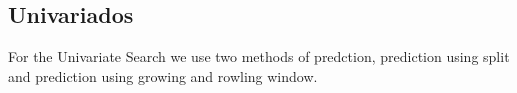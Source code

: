\subsection{Univariados}

\quad For the Univariate Search we use two methods of predction, prediction using split and prediction using growing and rowling window.


